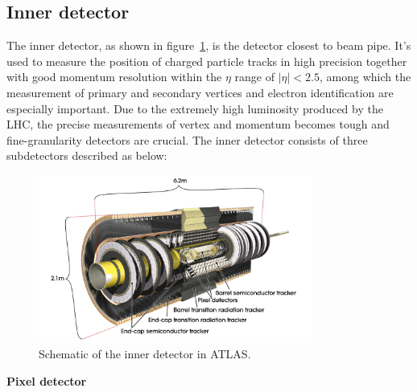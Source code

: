 \subsection{Inner detector}

The inner detector, as shown in figure~\ref{fig:inner_dec}, is the detector closest to beam pipe.
It's used to measure the position of charged particle tracks in high precision together with good momentum resolution within the $\eta$ range of $|\eta| < 2.5$,
among which the measurement of primary and secondary vertices and electron identification are especially important.
Due to the extremely high luminosity produced by the LHC, the precise measurements of vertex and momentum becomes tough and fine-granularity detectors are crucial.
The inner detector consists of three subdetectors described as below:
\begin{figure}[!htb]
  \centering
  \includegraphics[width=0.8\textwidth]{figures/Detector/ID_newTRT_d3.png}
  \caption{Schematic of the inner detector in ATLAS\cite{Aad:1698966}.}
  \label{fig:inner_dec}
\end{figure}

\textbf{Pixel detector}

